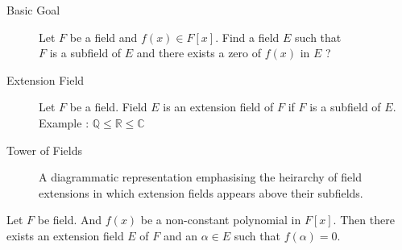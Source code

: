 \begin{description}
	\item[Basic Goal] Let $F$ be a field and $f(x) \in F[x]$.
	Find a field $E$ such that\\
	$F$ is a subfield of $E$ and there exists a zero of $f(x)$ in $E$ ?
	\item[Extension Field] Let $F$ be a field.
	Field $E$ is an extension field of $F$ if $F$ is a subfield of $E$. \\
	Example : $\mathbb{Q} \le \mathbb{R} \le \mathbb{C}$
	\item[Tower of Fields] A diagrammatic representation emphasising the heirarchy of field extensions in which extension fields appears above their subfields.
\end{description}

\begin{theorem}[Kronecker]
	Let $F$ be field. And $f(x)$ be a non-constant polynomial in $F[x]$. Then there exists an extension field $E$ of $F$ and an $\alpha \in E$ such that $f(\alpha) = 0$.
\end{theorem}

